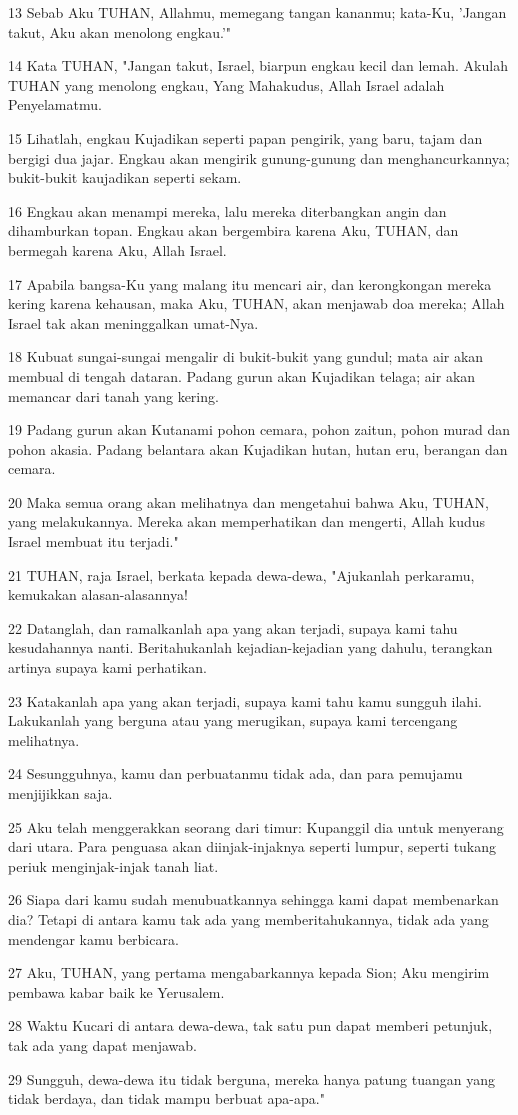 \par 13 Sebab Aku TUHAN, Allahmu, memegang tangan kananmu; kata-Ku, 'Jangan takut, Aku akan menolong engkau.'"
\par 14 Kata TUHAN, "Jangan takut, Israel, biarpun engkau kecil dan lemah. Akulah TUHAN yang menolong engkau, Yang Mahakudus, Allah Israel adalah Penyelamatmu.
\par 15 Lihatlah, engkau Kujadikan seperti papan pengirik, yang baru, tajam dan bergigi dua jajar. Engkau akan mengirik gunung-gunung dan menghancurkannya; bukit-bukit kaujadikan seperti sekam.
\par 16 Engkau akan menampi mereka, lalu mereka diterbangkan angin dan dihamburkan topan. Engkau akan bergembira karena Aku, TUHAN, dan bermegah karena Aku, Allah Israel.
\par 17 Apabila bangsa-Ku yang malang itu mencari air, dan kerongkongan mereka kering karena kehausan, maka Aku, TUHAN, akan menjawab doa mereka; Allah Israel tak akan meninggalkan umat-Nya.
\par 18 Kubuat sungai-sungai mengalir di bukit-bukit yang gundul; mata air akan membual di tengah dataran. Padang gurun akan Kujadikan telaga; air akan memancar dari tanah yang kering.
\par 19 Padang gurun akan Kutanami pohon cemara, pohon zaitun, pohon murad dan pohon akasia. Padang belantara akan Kujadikan hutan, hutan eru, berangan dan cemara.
\par 20 Maka semua orang akan melihatnya dan mengetahui bahwa Aku, TUHAN, yang melakukannya. Mereka akan memperhatikan dan mengerti, Allah kudus Israel membuat itu terjadi."
\par 21 TUHAN, raja Israel, berkata kepada dewa-dewa, "Ajukanlah perkaramu, kemukakan alasan-alasannya!
\par 22 Datanglah, dan ramalkanlah apa yang akan terjadi, supaya kami tahu kesudahannya nanti. Beritahukanlah kejadian-kejadian yang dahulu, terangkan artinya supaya kami perhatikan.
\par 23 Katakanlah apa yang akan terjadi, supaya kami tahu kamu sungguh ilahi. Lakukanlah yang berguna atau yang merugikan, supaya kami tercengang melihatnya.
\par 24 Sesungguhnya, kamu dan perbuatanmu tidak ada, dan para pemujamu menjijikkan saja.
\par 25 Aku telah menggerakkan seorang dari timur: Kupanggil dia untuk menyerang dari utara. Para penguasa akan diinjak-injaknya seperti lumpur, seperti tukang periuk menginjak-injak tanah liat.
\par 26 Siapa dari kamu sudah menubuatkannya sehingga kami dapat membenarkan dia? Tetapi di antara kamu tak ada yang memberitahukannya, tidak ada yang mendengar kamu berbicara.
\par 27 Aku, TUHAN, yang pertama mengabarkannya kepada Sion; Aku mengirim pembawa kabar baik ke Yerusalem.
\par 28 Waktu Kucari di antara dewa-dewa, tak satu pun dapat memberi petunjuk, tak ada yang dapat menjawab.
\par 29 Sungguh, dewa-dewa itu tidak berguna, mereka hanya patung tuangan yang tidak berdaya, dan tidak mampu berbuat apa-apa."

